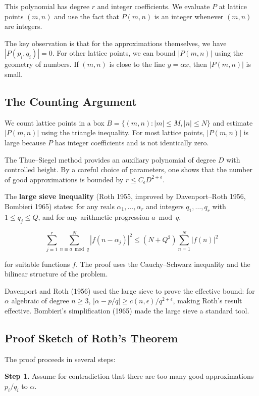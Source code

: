 This polynomial has degree $r$ and integer coefficients. We evaluate $P$ at
lattice points $(m,n)$ and use the fact that $P(m,n)$ is an integer whenever
$(m,n)$ are integers.

The key observation is that for the approximations themselves, we have
$|P(p_i, q_i)| = 0$. For other lattice points, we can bound $|P(m,n)|$ using
the geometry of numbers. If $(m,n)$ is close to the line $y = \alpha x$, then
$|P(m,n)|$ is small.

\subsection*{The Counting Argument}

We count lattice points in a box $B = \{(m,n) : |m| \leq M, |n| \leq N\}$
and estimate $|P(m,n)|$ using the triangle inequality. For most lattice
points, $|P(m,n)|$ is large because $P$ has integer coefficients and is not
identically zero.

The Thue--Siegel method provides an auxiliary polynomial of degree $D$ with
controlled height. By a careful choice of parameters, one shows that the number
of good approximations is bounded by $r \leq C_\epsilon D^{2+\epsilon}$.

The \textbf{large sieve inequality} (Roth 1955, improved by
Davenport--Roth 1956, Bombieri 1965) states: for any reals $\alpha_1, \ldots,
\alpha_r$ and integers $q_1, \ldots, q_r$ with $1 \leq q_j \leq Q$, and for
any arithmetic progression $a \bmod q$,

\[\sum_{j=1}^r \sum_{n \equiv a \bmod q}^N |f(n - \alpha_j)|^2 \leq (N +
Q^2) \sum_{n=1}^N |f(n)|^2\]

for suitable functions $f$. The proof uses the Cauchy--Schwarz inequality and
the bilinear structure of the problem.

Davenport and Roth (1956) used the large sieve to prove the effective bound:
for $\alpha$ algebraic of degree $n \geq 3$, $|\alpha - p/q| \geq c(n,
\epsilon)/q^{2+\epsilon}$, making Roth's result effective. Bombieri's
simplification (1965) made the large sieve a standard tool.

\subsection*{Proof Sketch of Roth's Theorem}

The proof proceeds in several steps:

\textbf{Step 1.} Assume for contradiction that there are too many good
approximations $p_i/q_i$ to $\alpha$.

